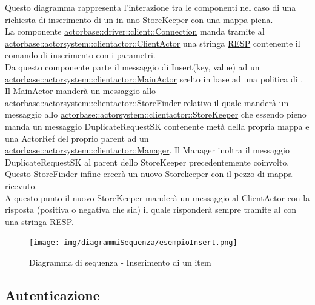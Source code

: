 \documentclass{scalatekids-article}
\begin{document}
Questo diagramma rappresenta l'interazione tra le componenti nel caso di una richiesta di inserimento di un  in uno StoreKeeper con una mappa piena.\\
La componente \hyperref[sec:actorbase::driver::client::Connection]{actorbase::driver::client::Connection}
manda tramite  al \hyperref[sec:actorbase::actorsystem::clientactor::ClientActor]{actorbase::actorsystem::clientactor::ClientActor}
una stringa \hyperref[sec:RESP]{RESP} contenente il comando di inserimento  con
i parametri.\\
Da questo componente parte il messaggio di Insert(key, value) ad un \hyperref[sec:actorbase::actorsystem::clientactor::MainActor]{actorbase::actorsystem::clientactor::MainActor} scelto in base ad una
politica di . Il MainActor manderà un messaggio allo \hyperref[sec:actorbase::actorsystem::clientactor::StoreFinder]{actorbase::actorsystem::clientactor::StoreFinder} relativo il quale manderà un messaggio allo \hyperref[sec:actorbase::actorsystem::clientactor::StoreKeeper]{actorbase::actorsystem::clientactor::StoreKeeper} che essendo pieno manda un
messaggio DuplicateRequestSK contenente metà della propria mappa e una ActorRef del proprio parent ad un \hyperref[sec:actorbase::actorsystem::clientactor::Manager]{actorbase::actorsystem::clientactor::Manager}. Il Manager inoltra il messaggio DuplicateRequestSK al parent dello StoreKeeper precedentemente coinvolto. Questo StoreFinder infine creerà un nuovo Storekeeper con il pezzo di mappa ricevuto. \\
A questo punto il nuovo StoreKeeper manderà un messaggio al ClientActor con
la risposta (positiva o negativa che sia) il quale risponderà sempre tramite
 al  con una stringa RESP.
\begin{figure}[H]
  \begin{center}
    \texttt{[image: img/diagrammiSequenza/esempioInsert.png]}
    \caption{Diagramma di sequenza - Inserimento di un item}
  \end{center}
\end{figure}

\subsection{Autenticazione}
\end{document}
